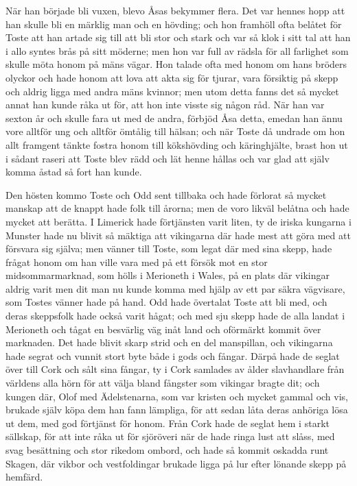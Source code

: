 \initial När han började bli vuxen, blevo Åsas bekymmer flera. Det var hennes hopp att han skulle bli en märklig man och en hövding; och hon framhöll ofta belåtet för Toste att han artade sig till att bli stor och stark och var så klok i sitt tal att han i allo syntes brås på sitt möderne; men hon var full av rädsla för all farlighet som skulle möta honom på mäns vägar. Hon talade ofta med honom om hans bröders olyckor och hade honom att lova att akta sig för tjurar, vara försiktig på skepp och aldrig ligga med andra mäns kvinnor; men utom detta fanns det så mycket annat han kunde råka ut för, att hon inte visste sig någon råd. När han var sexton år och skulle fara ut med de andra, förbjöd Åsa detta, emedan han ännu vore alltför ung och alltför ömtålig till hälsan; och när Toste då undrade om hon allt framgent tänkte fostra honom till kökshövding och käringhjälte, brast hon ut i sådant raseri att Toste blev rädd och lät henne hållas och var glad att själv komma åstad så fort han kunde.

\initial Den hösten kommo Toste och Odd sent tillbaka och hade förlorat så mycket manskap att de knappt hade folk till årorna; men de voro likväl belåtna och hade mycket att berätta. I Limerick hade förtjänsten varit liten, ty de iriska kungarna i Munster hade nu blivit så mäktiga att vikingarna där hade mest att göra med att försvara sig själva; men vänner till Toste, som legat där med sina skepp, hade frågat honom om han ville vara med på ett försök mot en stor midsommarmarknad, som hölls i Merioneth i Wales, på en plats där vikingar aldrig varit men dit man nu kunde komma med hjälp av ett par säkra vägvisare, som Tostes vänner hade på hand. Odd hade övertalat Toste att bli med, och deras skeppsfolk hade också varit hågat; och med sju skepp hade de alla landat i Merioneth och tågat en besvärlig väg inåt land och oförmärkt kommit över marknaden. Det hade blivit skarp strid och en del manspillan, och vikingarna hade segrat och vunnit stort byte både i gods och fångar. Därpå hade de seglat över till Cork och sålt sina fångar, ty i Cork samlades av ålder slavhandlare från världens alla hörn för att välja bland fångster som vikingar bragte dit; och kungen där, Olof med Ädelstenarna, som var kristen och mycket gammal och vis, brukade själv köpa dem han fann lämpliga, för att sedan låta deras anhöriga lösa ut dem, med god förtjänst för honom. Från Cork hade de seglat hem i starkt sällskap, för att inte råka ut för sjöröveri när de hade ringa lust att slåss, med svag besättning och stor rikedom ombord, och hade så kommit oskadda runt Skagen, där vikbor och vestfoldingar brukade ligga på lur efter lönande skepp på hemfärd.

